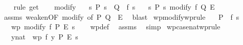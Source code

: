 \begin{isabellebody}
\ \ \isamarkupfalse%
\ {\isacharparenleft}{\kern0pt}rule\ get{\isacharparenright}{\kern0pt}\isanewline
\ \ \isamarkupfalse%
%
\endisatagproof
{\isafoldproof}%
%
\isadelimproof
\isanewline
%
\endisadelimproof
\isanewline
{}\isamarkupfalse%
\ modify{\isacharprime}{\kern0pt}{\isacharcolon}{\kern0pt}\isanewline
\ \ \ {\isachardoublequoteopen}{\isasymforall}s{\isachardot}{\kern0pt}\ P\ s\ {\isasymlongrightarrow}\ Q\ {\isacharparenleft}{\kern0pt}{\isacharparenright}{\kern0pt}\ {\isacharparenleft}{\kern0pt}f\ s{\isacharparenright}{\kern0pt}{\isachardoublequoteclose}\isanewline
\ \ \ {\isachardoublequoteopen}{\isasymlbrace}{\isasymlambda}s{\isachardot}{\kern0pt}\ P\ s{\isasymrbrace}\ modify\ f\ {\isasymlbrace}Q{\isasymrbrace}{\isacharcomma}{\kern0pt}\ {\isasymlbrace}E{\isasymrbrace}{\isachardoublequoteclose}\isanewline
%
\isadelimproof
\ \ %
\endisadelimproof
%
\isatagproof
{}\isamarkupfalse%
\ assms\ weaken{\isacharbrackleft}{\kern0pt}OF\ modify{\isacharcomma}{\kern0pt}\ of\ P\ Q\ {\isacharunderscore}{\kern0pt}\ E{\isacharbrackright}{\kern0pt}\ \isamarkupfalse%
\ blast%
\endisatagproof
{\isafoldproof}%
%
\isadelimproof
\isanewline
%
\endisadelimproof
\isanewline
{}\isamarkupfalse%
\ wpmodify{\isacharbrackleft}{\kern0pt}wprule{\isacharbrackright}{\kern0pt}{\isacharcolon}{\kern0pt}\isanewline
\ \ \ {\isachardoublequoteopen}P\ {\isacharparenleft}{\kern0pt}{\isacharparenright}{\kern0pt}\ {\isacharparenleft}{\kern0pt}f\ s{\isacharparenright}{\kern0pt}{\isachardoublequoteclose}\isanewline
\ \ \ {\isachardoublequoteopen}wp\ {\isacharparenleft}{\kern0pt}modify\ f{\isacharparenright}{\kern0pt}\ P\ E\ s{\isachardoublequoteclose}\isanewline
%
\isadelimproof
\ \ %
\endisadelimproof
%
\isatagproof
{}\isamarkupfalse%
\ wp{\isacharunderscore}{\kern0pt}def\ \isamarkupfalse%
\ assms\ \isamarkupfalse%
\ simp%
\endisatagproof
{\isafoldproof}%
%
\isadelimproof
\isanewline
%
\endisadelimproof
\isanewline
{}\isamarkupfalse%
\ wpcasenat{\isacharbrackleft}{\kern0pt}wprule{\isacharbrackright}{\kern0pt}{\isacharcolon}{\kern0pt}\isanewline
\ \ \ {\isachardoublequoteopen}{\isacharparenleft}{\kern0pt}y{\isacharequal}{\kern0pt}{\isacharparenleft}{\kern0pt}{}{\isacharcolon}{\kern0pt}{\isacharcolon}{\kern0pt}nat{\isacharparenright}{\kern0pt}\ {\isasymLongrightarrow}\ wp\ {\isacharparenleft}{\kern0pt}f\ y{\isacharparenright}{\kern0pt}\ P\ E\ s{\isacharparenright}{\kern0pt}{\isachardoublequoteclose}\isanewline

\end{isabellebody}
